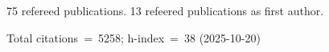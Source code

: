 75 refereed publications. 13 refeered publications as first author.

Total citations~=~5258; h-index~=~38 (2025-10-20)